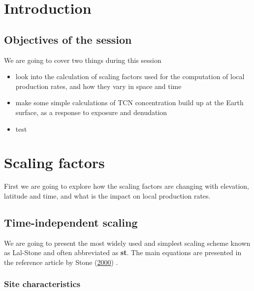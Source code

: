 \documentclass[
]{book}
\providecommand{\tightlist}{%
  \setlength{\itemsep}{0pt}\setlength{\parskip}{0pt}}
\begin{document}
\hypertarget{introduction}{%
\chapter{Introduction}\label{introduction}}

\hypertarget{objectives-of-the-session}{%
\section{Objectives of the session}\label{objectives-of-the-session}}

We are going to cover two things during this session

\begin{itemize}
\tightlist
\item
  look into the calculation of scaling factors used for the computation of local production rates, and how they vary in space and time
\item
  make some simple calculations of TCN concentration build up at the Earth surface, as a response to exposure and denudation
\item
  test
\end{itemize}

\hypertarget{scaling-factors}{%
\chapter{Scaling factors}\label{scaling-factors}}

First we are going to explore how the scaling factors are changing with elevation, latitude and time, and what is the impact on local production rates.

\hypertarget{time-independent-scaling}{%
\section{Time-independent scaling}\label{time-independent-scaling}}

We are going to present the most widely used and simplest scaling scheme known as Lal-Stone and often abbreviated as \textbf{st}. The main equations are presented in the reference article by Stone (\protect\hyperlink{ref-stone2000air}{2000}) .

\hypertarget{site-characteristics}{%
\subsection{Site characteristics}\label{site-characteristics}}
\end{document}

